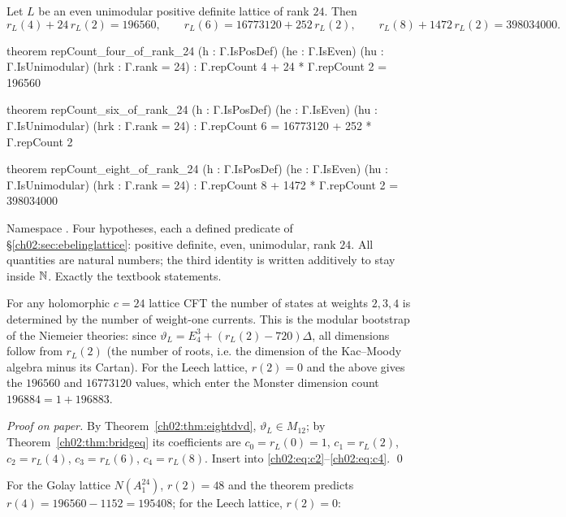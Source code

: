 \begin{theorem}\label{ch02:thm:rank24}
Let $L$ be an even unimodular positive definite lattice of rank $24$.  Then
\begin{equation*}
r_L(4)+24\,r_L(2)=196560,\qquad r_L(6)=16773120+252\,r_L(2),\qquad
r_L(8)+1472\,r_L(2)=398034000 .
\end{equation*}
\end{theorem}
\begin{leancode}
theorem repCount_four_of_rank_24 (h : Γ.IsPosDef) (he : Γ.IsEven) (hu : Γ.IsUnimodular)
    (hrk : Γ.rank = 24) : Γ.repCount 4 + 24 * Γ.repCount 2 = 196560

theorem repCount_six_of_rank_24 (h : Γ.IsPosDef) (he : Γ.IsEven) (hu : Γ.IsUnimodular)
    (hrk : Γ.rank = 24) : Γ.repCount 6 = 16773120 + 252 * Γ.repCount 2

theorem repCount_eight_of_rank_24 (h : Γ.IsPosDef) (he : Γ.IsEven) (hu : Γ.IsUnimodular)
    (hrk : Γ.rank = 24) : Γ.repCount 8 + 1472 * Γ.repCount 2 = 398034000
\end{leancode}
\begin{dictionary}
Namespace .  Four hypotheses, each a defined predicate of
\S\ref{ch02:sec:ebelinglattice}: positive definite, even, unimodular, rank $24$.  All quantities
are natural numbers; the third identity is written additively to stay inside ${\mathbb{N}}$.  Exactly the
textbook statements.
\end{dictionary}
\begin{physics}
For any holomorphic $c=24$ lattice CFT the number of states at weights $2,3,4$ is determined by the number of weight-one currents. This is the modular bootstrap of the Niemeier theories: since $\vartheta_L=E_4^3+(r_L(2)-720)\Delta$, all dimensions follow from $r_L(2)$ (the number of roots, i.e. the dimension of the Kac--Moody algebra minus its Cartan). For the Leech lattice, $r(2)=0$ and the above gives the $196560$ and $16773120$ values, which enter the Monster dimension count $196884=1+196883$.
\end{physics}
\emph{Proof on paper.}  By Theorem~\ref{ch02:thm:eightdvd}, $\vartheta_L\in M_{12}$; by
Theorem~\ref{ch02:thm:bridgeq} its coefficients are $c_0=r_L(0)=1$, $c_1=r_L(2)$, $c_2=r_L(4)$,
$c_3=r_L(6)$, $c_4=r_L(8)$.  Insert into \eqref{ch02:eq:c2}--\eqref{ch02:eq:c4}.  \qed

For the Golay lattice $N(A_1^{24})$, $r(2)=48$ and the theorem predicts $r(4)=196560-1152=195408$;
for the Leech lattice, $r(2)=0$:

